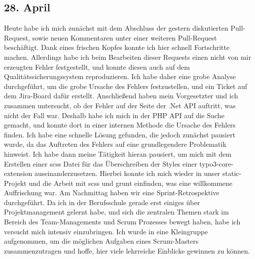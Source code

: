 \subsection{28. April}
Heute habe ich mich zunächst mit dem Abschluss der gestern diskutierten Pull-Request, sowie neuen Kommentaren unter einer weiteren Pull-Request beschäftigt. Dank eines frischen Kopfes konnte ich hier schnell Fortschritte machen. Allerdings habe ich beim Bearbeiten dieser Requests einen nicht von mir erzeugten Fehler festgestellt, und konnte diesen auch auf dem Qualitätssicherungssystem reproduzieren. Ich habe daher eine grobe Analyse durchgeführt, um die grobe Ursache des Fehlers festzustellen, und ein Ticket auf dem Jira-Board dafür erstellt. Anschließend haben mein Vorgesetzter und ich zusammen untersucht, ob der Fehler auf der Seite der .Net API auftritt, was nicht der Fall war. Deshalb habe ich mich in der PHP API auf die Suche gemacht, und konnte dort in einer internen Methode die Ursache des Fehlers finden. Ich habe eine schnelle Lösung gefunden, die jedoch zunächst pausiert wurde, da das Auftreten des Fehlers auf eine grundlegendere Problematik hinweist. Ich habe dann meine Tätigkeit hieran pausiert, um mich mit dem Erstellen einer scss Datei für das Überschreiben der Styles einer typo3-core-extension auseinanderzusetzen. Hierbei konnte ich mich wieder in unser static-Projekt und die Arbeit mit scss und grunt einfinden, was eine willkommene Auffrischung war.
Am Nachmittag haben wir eine Sprint-Retrospektive durchgeführt. Da ich in der Berufsschule gerade erst einiges über Projektmanagement gelernt habe, und sich die zentralen Themen stark im Bereich des Team-Managements und Scrum Prozesses bewegt haben, habe ich versucht mich intensiv einzubringen. Ich wurde in eine Kleingruppe aufgenommen, um die möglichen Aufgaben eines Scrum-Masters zusammenzutragen und hoffe, hier viele lehrreiche Einblicke gewinnen zu können.